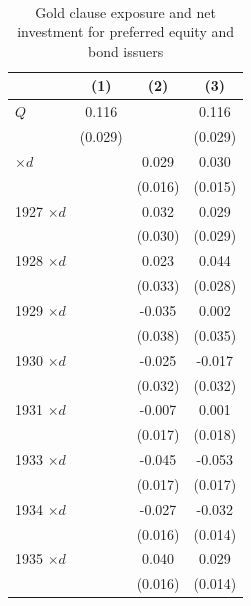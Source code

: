 \begin{table}[p]\centering
\caption{\\ Gold clause exposure and net investment for preferred equity and bond issuers} \footnotesize   \label{tab:inv_pos}  \renewcommand{\arraystretch}{1.2}
\begin{tabular}{lccc}
\toprule
 & (1) & (2) & (3) \\
\midrule
$Q$              & 0.116\sym{***} &               & 0.116\sym{***} \\
                 & (0.029)        &               & (0.029)        \\
\addlinespace[0.35em]
1926 $\times d$  &                & 0.029          & 0.030\sym{*}   \\
                 &                & (0.016)        & (0.015)        \\
1927 $\times d$  &                & 0.032          & 0.029          \\
                 &                & (0.030)        & (0.029)        \\
1928 $\times d$  &                & 0.023          & 0.044          \\
                 &                & (0.033)        & (0.028)        \\
1929 $\times d$  &                & -0.035         & 0.002          \\
                 &                & (0.038)        & (0.035)        \\
1930 $\times d$  &                & -0.025         & -0.017         \\
                 &                & (0.032)        & (0.032)        \\
1931 $\times d$  &                & -0.007         & 0.001          \\
                 &                & (0.017)        & (0.018)        \\
1933 $\times d$  &                & -0.045\sym{**} & -0.053\sym{***}\\
                 &                & (0.017)        & (0.017)        \\
1934 $\times d$  &                & -0.027         & -0.032\sym{**} \\
                 &                & (0.016)        & (0.014)        \\
1935 $\times d$  &                & 0.040\sym{**}  & 0.029\sym{*}   \\
                 &                & (0.016)        & (0.014)        \\

\end{tabular}
\end{table}
